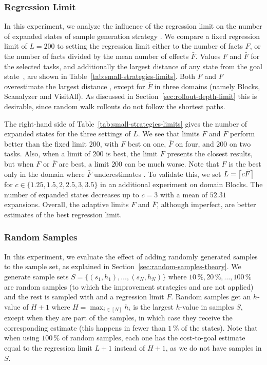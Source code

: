 

\subsubsection{Regression Limit}

In this experiment, we analyze the influence of the regression limit on the number of expanded states of sample generation strategy \bfsrw. We compare a fixed regression limit of $L=200$ to setting the regression limit either to the number of facts $F$, or the number of facts divided by the mean number of effects $\bar F$. Values $F$ and $\bar F$ for the selected tasks, and additionally the largest distance of any state from the goal state~\distfarthest, are shown in Table~\ref{tab:small-strategies-limits}. Both $F$ and $\bar F$ overestimate the largest distance \distfarthest, except for $\bar F$ in three domains (namely Blocks, Scanalyzer and VisitAll). As discussed in Section~\ref{sec:rollout-depth-limit} this is desirable, since random walk rollouts do not follow the shortest paths.



The right-hand side of Table~\ref{tab:small-strategies-limits} gives the number of expanded states for the three settings of $L$. We see that limits $F$ and $\bar F$ perform better than the fixed limit $200$, with $F$ best on one, $\bar F$ on four, and $200$ on two tasks. Also, when a limit of $200$ is best, the limit $F$ presents the closest results, but when $F$ or $\bar F$ are best, a limit $200$ can be much worse.  Note that $F$ is the best only in the domain where $\bar F$ underestimates \distfarthest.  To validate this, we set $L=\left\lceil c\bar F\right\rceil$ for $c\in\{1.25,1.5,2,2.5,3,3.5\}$ in an additional experiment on domain Blocks. The number of expanded states decreases up to $c=3$ with a mean of $52.31$ expansions. Overall, the adaptive limits $F$ and $\bar F$, although imperfect, are better estimates of the best regression limit.

\subsubsection{Random Samples}

In this experiment, we evaluate the effect of adding randomly generated samples to the sample set, as explained in Section~\ref{sec:random-samples-theory}. We generate sample sets $S=\{(s_1,h_1),\ldots,(s_N,h_N)\}$ where $10\,\%, 20\,\%,\ldots,100\,\%$ are random samples (to which the improvement strategies \hmin and \hvfc are not applied) and the rest is sampled with \bfsrw and a regression limit $\bar F$. Random samples get an $h$-value of $H+1$ where $H=\max_{i\in[N]} h_i$ is the largest $h$-value in samples $S$, except when they are part of the samples, in which case they receive the corresponding estimate (this happens in fewer than $1\,\%$ of the states). Note that when using $100\,\%$ of random samples, each one has the cost-to-goal estimate equal to the regression limit $L+1$ instead of $H+1$, as we do not have samples in $S$.

